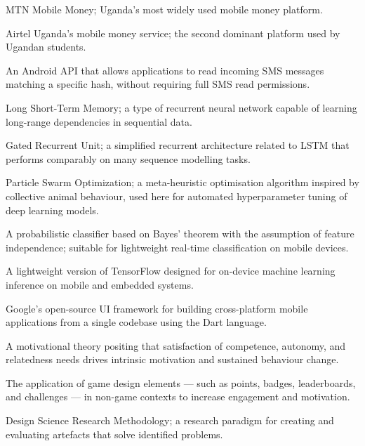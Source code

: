 \documentclass[12pt,a4paper]{report}
\begin{document}
\begin{description}[leftmargin=3cm, style=nextline]
    \item[MTN MoMo] MTN Mobile Money; Uganda's most widely used mobile money platform.
    \item[Airtel Money] Airtel Uganda's mobile money service; the second dominant platform used by Ugandan students.
    \item[SMS Retriever API] An Android API that allows applications to read incoming SMS messages matching a specific hash, without requiring full SMS read permissions.
    \item[LSTM] Long Short-Term Memory; a type of recurrent neural network capable of learning long-range dependencies in sequential data.
    \item[GRU] Gated Recurrent Unit; a simplified recurrent architecture related to LSTM that performs comparably on many sequence modelling tasks.
    \item[PSO] Particle Swarm Optimization; a meta-heuristic optimisation algorithm inspired by collective animal behaviour, used here for automated hyperparameter tuning of deep learning models.
    \item[Gaussian Naive Bayes] A probabilistic classifier based on Bayes' theorem with the assumption of feature independence; suitable for lightweight real-time classification on mobile devices.
    \item[TensorFlow Lite] A lightweight version of TensorFlow designed for on-device machine learning inference on mobile and embedded systems.
    \item[Flutter] Google's open-source UI framework for building cross-platform mobile applications from a single codebase using the Dart language.
    \item[Self-Determination Theory (SDT)] A motivational theory positing that satisfaction of competence, autonomy, and relatedness needs drives intrinsic motivation and sustained behaviour change.
    \item[Gamification] The application of game design elements --- such as points, badges, leaderboards, and challenges --- in non-game contexts to increase engagement and motivation.
    \item[DSRM] Design Science Research Methodology; a research paradigm for creating and evaluating artefacts that solve identified problems.
\end{description}

\end{document}
